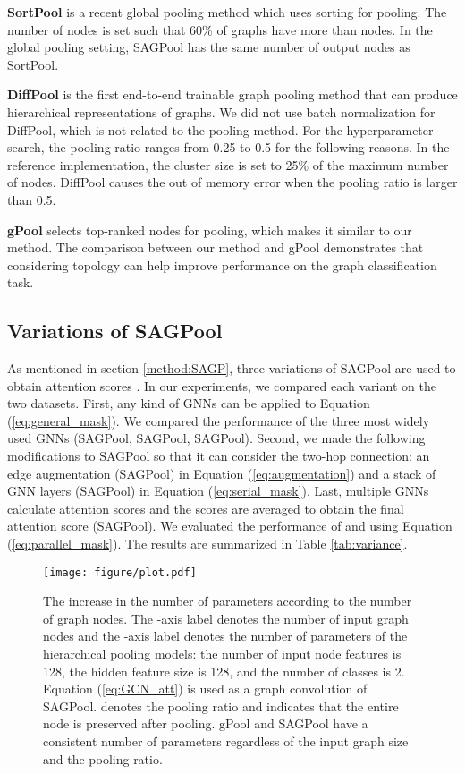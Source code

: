\documentclass{article}
\begin{document}
\textbf{SortPool} \cite{zhang2018end} is a recent global pooling method which uses sorting for pooling. The  number of nodes is set such that 60\% of graphs have more than  nodes. In the global pooling setting, SAGPool has the same  number of output nodes as SortPool.

\textbf{DiffPool} \cite{RexYing} is the first end-to-end trainable graph pooling method that can produce hierarchical representations of graphs. We did not use batch normalization for DiffPool, which is not related to the pooling method. For the hyperparameter search, the pooling ratio ranges from 0.25 to 0.5 for the following reasons. In the reference implementation, the cluster size is set to 25\% of the maximum number of nodes. DiffPool causes the out of memory error when the pooling ratio is larger  than 0.5.

\textbf{gPool} \cite{gao2019graph} selects top-ranked nodes for pooling, which makes it similar to our method. The comparison between our method and gPool demonstrates that considering topology can help improve performance on the graph classification task.



\subsection{Variations of SAGPool}
\label{ex:variation}
As mentioned in section \ref{method:SAGP}, three variations of SAGPool are used to obtain attention scores . In our experiments, we compared each variant on the two datasets. First, any kind of GNNs can be applied to Equation (\ref{eq:general_mask}). We compared the performance of the three most widely used GNNs (SAGPool, SAGPool, SAGPool).
Second, we made the following modifications to SAGPool so that it can consider the two-hop connection: an edge augmentation (SAGPool) in Equation (\ref{eq:augmentation}) and a stack of GNN layers (SAGPool) in Equation (\ref{eq:serial_mask}). Last, multiple GNNs calculate attention scores and the scores are averaged to obtain the final attention score (SAGPool). We evaluated the performance of  and  using Equation (\ref{eq:parallel_mask}). The results are summarized in Table \ref{tab:variance}.


\begin{figure}[t!]
\vskip 0.2in
\begin{center}
\centerline{\texttt{[image: figure/plot.pdf]}}
\caption{The increase in the number of parameters according to the number of graph nodes. The -axis label denotes the number of input graph nodes and the -axis label denotes the number of parameters of the hierarchical pooling models: the number of input node features is 128, the hidden feature size is 128, and the number of classes is 2. Equation (\ref{eq:GCN_att}) is used as a graph convolution of SAGPool.  denotes the pooling ratio and  indicates that the entire node is preserved after pooling. gPool and SAGPool have a consistent number of parameters regardless of the input graph size and the pooling ratio.}
\label{plot}
\end{center}
\vskip -0.2in
\end{figure}
\end{document}

